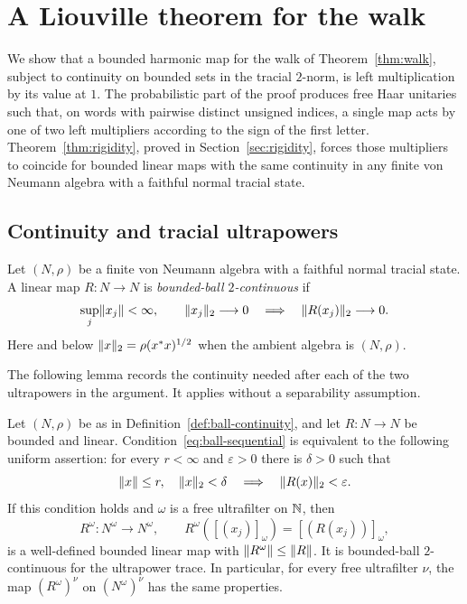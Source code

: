 \section{A Liouville theorem for the walk}\label{sec:liouville}

We show that a bounded harmonic map for the walk of
Theorem~\ref{thm:walk}, subject to continuity on bounded sets in the tracial
$2$-norm, is left multiplication by its value at $1$.  The probabilistic
part of the proof produces free Haar unitaries such that, on words with
pairwise distinct unsigned indices, a single map acts by one of two left
multipliers according to the sign of the first letter.
Theorem~\ref{thm:rigidity}, proved in Section~\ref{sec:rigidity},
forces those multipliers to coincide for bounded linear maps with the
same continuity in any finite von Neumann algebra with a faithful
normal tracial state.

\subsection{Continuity and tracial ultrapowers}

\begin{definition}\label{def:ball-continuity}
Let $(N,\rho)$ be a finite von Neumann algebra with a faithful normal
tracial state.  A linear map $R:N\to N$ is \emph{bounded-ball
$2$-continuous} if
\begin{equation}\label{eq:ball-sequential}
 \sup_j\lVert x_j\rVert<\infty,\qquad \lVert x_j\rVert_2\longrightarrow0
 \quad\Longrightarrow\quad
 \lVert R(x_j)\rVert_2\longrightarrow0.
\end{equation}
Here and below $\lVert x\rVert_2=\rho(x^*x)^{1/2}$ when the ambient algebra is
$(N,\rho)$.
\end{definition}

The following lemma records the continuity needed after each of the two
ultrapowers in the argument.  It applies without a separability
assumption.

\begin{lemma}\label{lem:ultrapower}
Let $(N,\rho)$ be as in Definition~\ref{def:ball-continuity}, and let
$R:N\to N$ be bounded and linear.  Condition~\eqref{eq:ball-sequential}
is equivalent to the following uniform assertion: for every $r<\infty$
and $\varepsilon>0$ there is $\delta>0$ such that
\begin{equation}\label{eq:ball-modulus}
 \lVert x\rVert\le r,\quad \lVert x\rVert_2<\delta
 \quad\Longrightarrow\quad \lVert R(x)\rVert_2<\varepsilon.
\end{equation}
If this condition holds and $\omega$ is a free ultrafilter on $\mathbb N$, then
\begin{equation}\label{eq:ultrapower-map}
 R^\omega:N^\omega\longrightarrow N^\omega,
 \qquad R^\omega([(x_j)]_\omega)=[(R(x_j))]_\omega,
\end{equation}
is a well-defined bounded linear map with
$\lVert R^\omega\rVert\le\lVert R\rVert$.  It is bounded-ball $2$-continuous for
the ultrapower trace.  In particular, for every free ultrafilter $\nu$,
the map $(R^\omega)^\nu$ on $(N^\omega)^\nu$ has the same properties.
\end{lemma}

